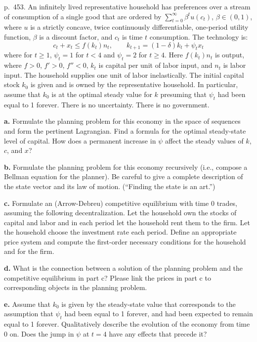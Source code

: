\documentclass[12pt, letterpaper]{article}
\begin{document}
\begin{tcolorbox}[oddbox,title={Exercise 11.3 \quad Anticipated productivity shift}]
\begin{tcolorbox}[questionbox]
p.~453. An infinitely lived representative household has preferences over a stream of consumption of a single good that
are ordered by $\sum_{t=0}^\infty\beta^tu(c_t)$, $\beta\in(0,1)$, where $u$ is a strictly concave, twice continuously
differentiable, one-period utility function, $\beta$ is a discount factor, and $c_t$ is time $t$ consumption. The
technology is:
\[
c_t+x_t\le f(k_t)n_t,\qquad k_{t+1}=(1-\delta)k_t+\psi_tx_t
\]
where for $t\ge1$, $\psi_t=1$ for $t<4$ and $\psi_t=2$ for $t\ge4$. Here $f(k_t)n_t$ is output, where $f>0$, $f'>0$,
$f''<0$, $k_t$ is capital per unit of labor input, and $n_t$ is labor input. The household supplies one unit of labor
inelastically. The initial capital stock $k_0$ is given and is owned by the representative household. In particular,
assume that $k_0$ is at the optimal steady value for $k$ presuming that $\psi_t$ had been equal to 1 forever. There is no
uncertainty. There is no government.

\textbf{a.} Formulate the planning problem for this economy in the space of sequences and form the pertinent Lagrangian.
Find a formula for the optimal steady-state level of capital. How does a permanent increase in $\psi$ affect the steady
values of $k$, $c$, and $x$?

\textbf{b.} Formulate the planning problem for this economy recursively (i.e., compose a Bellman equation for the
planner). Be careful to give a complete description of the state vector and its law of motion. (``Finding the state is
an art.'')

\textbf{c.} Formulate an (Arrow-Debreu) competitive equilibrium with time 0 trades, assuming the following
decentralization. Let the household own the stocks of capital and labor and in each period let the household rent them to
the firm. Let the household choose the investment rate each period. Define an appropriate price system and compute the
first-order necessary conditions for the household and for the firm.

\textbf{d.} What is the connection between a solution of the planning problem and the competitive equilibrium in part
c? Please link the prices in part c to corresponding objects in the planning problem.

\textbf{e.} Assume that $k_0$ is given by the steady-state value that corresponds to the assumption that $\psi_t$ had been
equal to 1 forever, and had been expected to remain equal to 1 forever. Qualitatively describe the evolution of the
economy from time 0 on. Does the jump in $\psi$ at $t=4$ have any effects that precede it?
\end{tcolorbox}


\end{tcolorbox}
\end{document}
